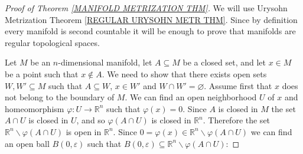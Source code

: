 \documentclass[11pt, letterpaper, oneside]{report}
\theoremstyle{pplain}
\newtheorem{ITERMVALUE THM}[theorem]{Intermediate Value Theorem}
\newtheorem{HEINEBOREL THM}[theorem]{Heine-Borel Theorem}
\newtheorem{UMETR THM}[theorem]{Urysohn Metrization Theorem}
\newtheorem{UMETR2 THM}[theorem]{Urysohn Metrization Theorem (v.2)}
\theoremstyle{ddefinition}
\theoremstyle{nnn}
\newtheorem{TDA NN}[theorem]{Topological Data Analysis. }
\theoremstyle{eexercise}
\newcommand{\R}{{\mathbb R}}
\newcommand{\ssmin}{\smallsetminus}
\begin{document}
\begin{proof}[Proof of Theorem \ref{MANIFOLD METRIZATION THM}]
We will use Urysohn Metrization Theorem \ref{REGULAR URYSOHN METR THM}. Since by definition 
every manifold is second countable it will be enough to prove that manifolds are regular topological spaces. 

Let $M$ be an $n$-dimensional manifold, let $A\subseteq M$ be a closed set, and let $x\in M$ be a point 
such that $x\not\in A$.  We need to show that there exists open sets $W, W'\subseteq M$ such that 
$A\subseteq W$, $x\in W'$ and $W\cap W' = \varnothing$.  Assume first that $x$ does not belong to the boundary of $M$.  We can find an open neighborhood $U$ of $x$ and homeomorphism 
$\varphi \colon U \to \R^{n}$ such that $\varphi(x) = 0$. 
Since $A$ is closed in $M$ the set $A\cap U$ is closed in $U$, and so 
$\varphi(A\cap U)$ is closed in $\R^{n}$. Therefore the set $\R^{n}\ssmin\varphi(A\cap U)$ is open 
in $\R^{n}$. Since $0 = \varphi(x)\in \R^{n}\ssmin\varphi(A\cap U)$ we can find an open ball 
$B(0, \varepsilon)$ such that $B(0, \varepsilon) \subseteq \R^{n}\ssmin\varphi(A\cap U)$:


\end{proof}
\end{document}
